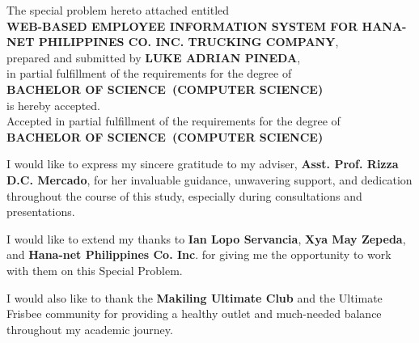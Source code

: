 \documentclass{icsthesis}
\renewcommand{\TITLE}{WEB-BASED EMPLOYEE INFORMATION SYSTEM FOR HANA-NET PHILIPPINES CO. INC. TRUCKING COMPANY}
\renewcommand{\AUTHOR}{LUKE ADRIAN PINEDA}
\renewcommand{\DEGREE}{BACHELOR OF SCIENCE}
\renewcommand{\MAJOR}{COMPUTER SCIENCE}
\begin{document}
	
	\begin{frontmatter}
		\maketitle
				
		\begin{approvalpage}

\vspace*{2cm}

\begin{center}
    The special problem hereto attached entitled\\
    \textbf{\TITLE},\\
    prepared and submitted by \textbf{\AUTHOR},\\[1em]
    in partial fulfillment of the requirements for the degree of\\
    \textbf{\DEGREE\ (\MAJOR)}\\[2em]
    
    is hereby accepted.\\[3em]

    Accepted in partial fulfillment of the requirements for the degree of\\
    \textbf{\DEGREE\ (\MAJOR)}\\[6em]
\end{center}

\vspace{2cm}

\vfill

\end{approvalpage}

	
		
		\begin{acknowledgement}
			I would like to express my sincere gratitude to my adviser, \textbf{Asst. Prof. Rizza D.C. Mercado}, for her invaluable guidance, unwavering support, and dedication throughout the course of this study, especially during consultations and presentations.

            I would like to extend my thanks to \textbf{Ian Lopo Servancia}, \textbf{Xya May Zepeda}, and\textbf{ Hana-net Philippines Co. Inc}. for giving me the opportunity to work with them on this Special Problem.

            I would also like to thank the \textbf{Makiling Ultimate Club} and the Ultimate Frisbee community for providing a healthy outlet and much-needed balance throughout my academic journey.


\end{acknowledgement}
\end{frontmatter}
\end{document}
